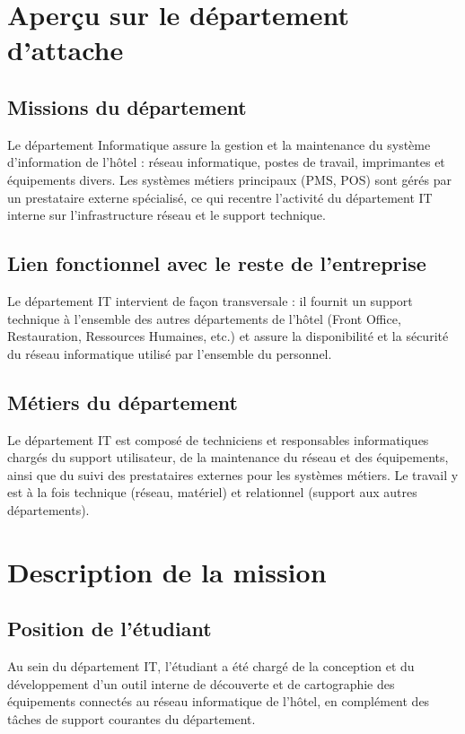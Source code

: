\section{Aperçu sur le département d'attache}

\subsection{Missions du département}

Le département Informatique assure la gestion et la maintenance du système
d'information de l'hôtel : réseau informatique, postes de travail, imprimantes et
équipements divers. Les systèmes métiers principaux (PMS, POS) sont gérés par un
prestataire externe spécialisé, ce qui recentre l'activité du département IT interne sur
l'infrastructure réseau et le support technique.

\subsection{Lien fonctionnel avec le reste de l'entreprise}

Le département IT intervient de façon transversale : il fournit un support technique à
l'ensemble des autres départements de l'hôtel (Front Office, Restauration, Ressources
Humaines, etc.) et assure la disponibilité et la sécurité du réseau informatique utilisé
par l'ensemble du personnel.

\subsection{Métiers du département}

Le département IT est composé de techniciens et responsables informatiques chargés du
support utilisateur, de la maintenance du réseau et des équipements, ainsi que du suivi
des prestataires externes pour les systèmes métiers. Le travail y est à la fois
technique (réseau, matériel) et relationnel (support aux autres départements).

\section{Description de la mission}

\subsection{Position de l'étudiant}

Au sein du département IT, l'étudiant a été chargé de la conception et du développement
d'un outil interne de découverte et de cartographie des équipements connectés au réseau
informatique de l'hôtel, en complément des tâches de support courantes du département.

